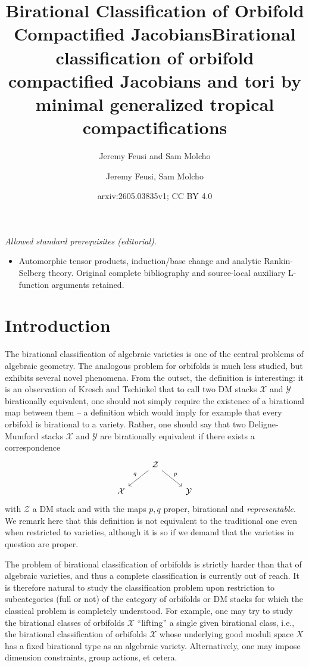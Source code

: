 \documentclass[11pt]{amsart}
\title{Birational Classification of Orbifold Compactified Jacobians}
\author{Jeremy Feusi and Sam Molcho}
\title{Birational classification of orbifold compactified Jacobians and tori by minimal generalized tropical compactifications}
\author{Jeremy Feusi, Sam Molcho}
\date{arxiv:2605.03835v1; CC BY 4.0}
\theoremstyle{definition}
\theoremstyle{remark}
\begin{document}
\maketitle
\noindent\textit{Allowed standard prerequisites (editorial).}\begin{itemize}
\item Automorphic tensor products, induction/base change and analytic Rankin-Selberg theory. Original complete bibliography and source-local auxiliary L-function arguments retained.
\end{itemize}\medskip
\section{Introduction}
The birational classification of algebraic varieties is one of the central
problems of algebraic geometry. The analogous problem for orbifolds is much
less studied, but exhibits several novel phenomena. From the outset, the definition
is interesting: it is an observation of Kresch and Tschinkel
\cite{KreschTschinkel} that to call two DM stacks $\mathcal{X}$ and
$\mathcal{Y}$ birationally equivalent, one should not simply require the
existence of a birational map between them -- a definition which would imply
for example that every orbifold is birational to a variety. Rather, one should
say that two Deligne-Mumford stacks $\mathcal{X}$ and $\mathcal{Y}$ are
birationally equivalent if there exists a correspondence
\[
\begin{tikzcd}
	& \mathcal{Z} \ar[rd,"p"] \ar[ld, swap, "q"] & \\ \mathcal{X}& &\mathcal{Y}
\end{tikzcd}
\]
with $\mathcal{Z}$ a DM stack and with the maps $p,q$ proper, birational and
\emph{representable}. We remark here that this definition is not equivalent to
the traditional one even when restricted to varieties, although it is
so if we demand that the varieties in question are proper.

The problem of birational classification of orbifolds is strictly
harder than that of algebraic varieties, and thus a complete classification is
currently out of reach. It is therefore natural to study the
classification problem upon restriction to subcategories (full or not) of the
category of orbifolds or DM stacks for which the classical problem is completely understood. For example, one may try to study the
birational classes of orbifolds $\mathcal{X}$ ``lifting'' a single given birational
class, i.e., the birational classification of orbifolds $\mathcal{X}$ whose
underlying good moduli space $X$ has a fixed birational type as an algebraic
variety. Alternatively, one may impose dimension constraints, group actions, et cetera.
\end{document}
